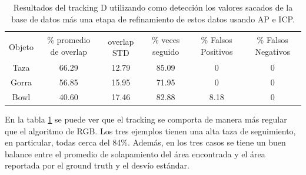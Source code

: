 \begin{table}
    \begin{tabular}{|c|c|c|c|c|c|}
    \hline
    & \multirow{2}{2.4cm}{\% promedio de overlap} & & \multirow{2}{2cm}{\% veces seguido} & \multirow{2}{1.6cm}{\% Falsos Positivos} & \multirow{2}{1.6cm}{\% Falsos Negativos}\\
	Objeto & & overlap STD & & &\\
    \hline
    Taza   & 66.29      & 12.79       & 85.09             & 0                & 0\\
    \hline
    Gorra  & 56.85      & 15.95       & 71.95             & 0                & 0\\
    \hline
    Bowl   & 40.60      & 17.46       & 82.88             & 8.18             & 0\\
    \hline
    \end{tabular}
\caption{Resultados del tracking D utilizando como detección los valores sacados de la base de datos más una etapa de refinamiento de estos datos usando AP e ICP.}
\label{tabla_d}
\end{table}

En la tabla \ref{tabla_d} se puede ver que el tracking se comporta de manera más regular que el algoritmo de RGB. Los tres ejemplos tienen una alta taza de seguimiento, en particular, todas cerca del 84\%. Además, en los tres casos se tiene un buen balance entre el promedio de solapamiento del área encontrada y el área reportada por el ground truth y el desvío estándar.

